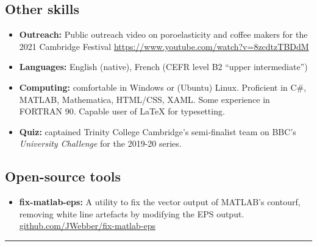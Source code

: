 \documentclass[a4paper]{article}
\begin{document}
\begin{multicols}{2}
        \subsection*{Other skills}
            \begin{itemize}
                \item \textbf{Outreach:} Public outreach video on poroelasticity and coffee makers for the 2021 Cambridge Festival \href{https://www.youtube.com/watch?v=8zcdtzTBDdM}{https://www.youtube.com/watch?v=8zcdtzTBDdM}
                \item \textbf{Languages:} English (native), French (CEFR level B2 ``upper intermediate'')
                \item \textbf{Computing:} comfortable in Windows or (Ubuntu) Linux. Proficient in C\#, MATLAB, Mathematica, HTML/CSS, XAML. Some experience in FORTRAN 90. Capable user of \LaTeX  \; for typesetting.
                \item \textbf{Quiz:}  captained Trinity College Cambridge's semi-finalist team on BBC's \emph{University Challenge} for the 2019-20 series.
            \end{itemize}
        \subsection*{Open-source tools}
            \begin{itemize}
                \item \textbf{fix-matlab-eps:} A utility to fix the vector output of MATLAB's \textsf{contourf}, removing white line artefacts by modifying the EPS output. \\ \href{https://github.com/JWebber/fix-matlab-eps}{github.com/JWebber/fix-matlab-eps}
            \end{itemize}
    \end{multicols}

    \vspace{1.5em}
    \hrule
    \vspace{0.25em}
\end{document}
